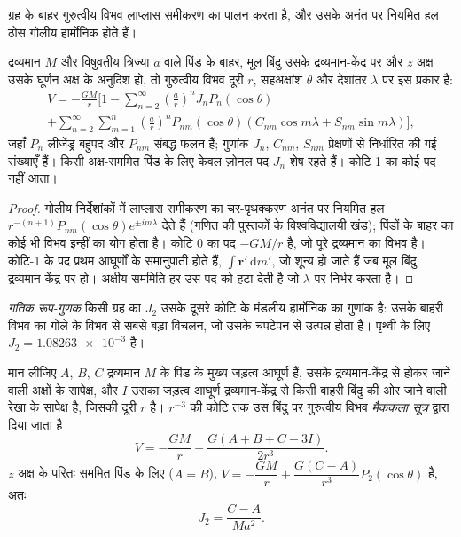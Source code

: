ग्रह के बाहर गुरुत्वीय विभव लाप्लास समीकरण का पालन करता है, और
उसके अनंत पर नियमित हल ठोस गोलीय हार्मोनिक होते हैं।

\begin{proposition}[भू-विभव का गोलीय-हार्मोनिक प्रसार]\label{prop:b3:gravity-geodesy:harmonics}
द्रव्यमान $M$ और विषुवतीय त्रिज्या $a$ वाले पिंड के बाहर, मूल बिंदु उसके
द्रव्यमान-केंद्र पर और $z$ अक्ष उसके घूर्णन अक्ष के अनुदिश हो, तो गुरुत्वीय
विभव दूरी $r$, सहअक्षांश $\theta$ और देशांतर $\lambda$ पर इस प्रकार है:
\begin{multline*}
  V = -\frac{GM}{r}\Biggl[1 - \sum_{n=2}^{\infty}\left(\frac ar\right)^nJ_nP_n(\cos\theta)\\
  + \sum_{n=2}^{\infty}\sum_{m=1}^{n}\left(\frac ar\right)^nP_{nm}(\cos\theta)
  (C_{nm}\cos m\lambda + S_{nm}\sin m\lambda)\Biggr],
\end{multline*}
जहाँ $P_n$ लीजेंड्र बहुपद और $P_{nm}$ संबद्ध फलन हैं; गुणांक
$J_n$, $C_{nm}$, $S_{nm}$ प्रेक्षणों से निर्धारित की गई संख्याएँ हैं। किसी
अक्ष-सममित पिंड के लिए केवल ज़ोनल पद $J_n$ शेष रहते हैं। कोटि 1 का
कोई पद नहीं आता।
\end{proposition}

\begin{proof}
गोलीय निर्देशांकों में लाप्लास समीकरण का चर-पृथक्करण
अनंत पर नियमित हल $r^{-(n+1)}P_{nm}(\cos\theta)e^{\pm
im\lambda}$ देते हैं (गणित की पुस्तकों के विश्वविद्यालयी खंड); पिंडों के बाहर का कोई भी विभव
इन्हीं का योग होता है। कोटि 0 का पद $-GM/r$ है, जो
पूरे द्रव्यमान का विभव है। कोटि-1 के पद प्रथम आघूर्णों के समानुपाती होते हैं,
$\int\mathbf r'\,\mathrm dm'$, जो शून्य हो जाते हैं जब मूल बिंदु द्रव्यमान-केंद्र पर हो।
अक्षीय सममिति हर उस पद को हटा देती है जो $\lambda$ पर निर्भर करता है।
\end{proof}

\begin{definition}[गतिक रूप-गुणक]\label{def:b3:gravity-geodesy:j2}
\emph{गतिक रूप-गुणक} किसी ग्रह का $J_2$
उसके दूसरे कोटि के मंडलीय हार्मोनिक का गुणांक है: उसके बाहरी विभव का
गोले के विभव से सबसे बड़ा विचलन, जो उसके चपटेपन से उत्पन्न होता है। पृथ्वी के लिए
$J_2 = \num{1.08263e-3}$ है।
\end{definition}

\begin{theorem}[मैककला सूत्र]\label{thm:b3:gravity-geodesy:maccullagh}
मान लीजिए $A$, $B$, $C$ द्रव्यमान $M$ के पिंड के मुख्य जड़त्व आघूर्ण हैं,
उसके द्रव्यमान-केंद्र से होकर जाने वाली अक्षों के सापेक्ष, और $I$ उसका जड़त्व आघूर्ण
द्रव्यमान-केंद्र से किसी बाहरी बिंदु की ओर जाने वाली रेखा के सापेक्ष है, जिसकी दूरी $r$ है। 
$r^{-3}$ की कोटि तक उस बिंदु पर गुरुत्वीय विभव
\emph{मैककला सूत्र} द्वारा दिया जाता है
\[
  V = -\frac{GM}{r} - \frac{G(A + B + C - 3I)}{2r^3} .
\]
$z$ अक्ष के परितः सममित पिंड के लिए ($A = B$),
$V = -\dfrac{GM}{r} + \dfrac{G(C - A)}{r^3}P_2(\cos\theta)$ है, अतः
\[
  J_2 = \frac{C - A}{Ma^2} .
\]
\end{theorem}

